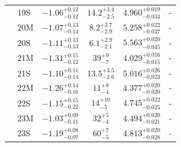 \documentclass{aa}
\begin{document}
{\begin{table}
\begin{tabular}{p{0.4em}|l|c|c|c|c}
&19S & $-1.06^{+0.12}_{-0.12}$ & $14.2^{+3.4}_{-2.5}$ & $4.960^{+0.019}_{-0.034}$ & - \\ 
&20M & $-1.07^{+0.13}_{-0.14}$ & $8.2^{+3.7}_{-2.9}$ & $5.258^{+0.022}_{-0.027}$ &-  \\
&20S & $-1.11^{+0.13}_{-0.13}$ & $6.1^{+2.9}_{-2.1}$ & $5.563^{+0.020}_{-0.045}$ & -\\ 
&21M & $-1.31^{+0.15}_{-0.12}$ & $39^{+9}_{-7}$ & $4.029^{+0.016}_{-0.015}$ & - \\ 
&21S & $-1.10^{+0.11}_{-0.14}$ & $13.5^{+3.5}_{-2.6}$ & $5.016^{+0.026}_{-0.023}$ & - \\ 
&22M & $-1.26^{+0.14}_{-0.16}$ & $11^{+8}_{-4}$ & $4.377^{+0.020}_{-0.020}$ & - \\ 
&22S & $-1.15^{+0.15}_{-0.22}$ & $14^{+10}_{-5}$ & $4.745^{+0.022}_{-0.025}$ & - \\ 
&23M & $-1.03^{+0.09}_{-0.11}$ & $32^{+5}_{-4}$ & $4.494^{+0.020}_{-0.021}$ &  -\\ 
& 23S & $-1.19^{+0.08}_{-0.07}$ & $60^{+7}_{-5}$ & $4.813^{+0.020}_{-0.028}$ & - \\
\hline
                \end{tabular}
        \end{table}
}
\end{document}
